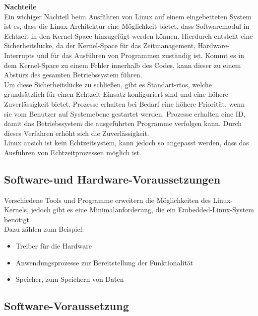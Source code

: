 \textbf{Nachteile}\\
Ein wichiger Nachteil beim Ausführen von Linux auf einem eingebetteten System ist es, dass die Linux-Architektur eine Möglichkeit bietet, dass Softwaremodul in
Echtzeit in den Kernel-Space hinzugefügt werden können. Hierdurch entsteht eine Sicherheitslücke, da der Kernel-Space für das Zeitmanagement, Hardware-Interrupts und
für das Ausführen von Programmen zuständig ist. Kommt es in dem Kernel-Space zu einem Fehler innerhalb des Codes, kann dieser zu einem Absturz des gesamten
Betriebssystem führen.\\
Um diese Sicherheitslücke zu schließen, gibt es Standart-\ac{rtos}, welche grundsätzlich für einen Echtzeit-Einsatz konfiguriert sind und eine höhere Zuverlässigkeit bietet.
Prozesse erhalten bei Bedarf eine höhere Priorität,
 wenn sie vom Benutzer auf Systemebene gestartet werden. Prozesse erhalten eine ID, damit das Betriebssystem die ausgeführten Programme verfolgen kann.
  Durch dieses Verfahren erhöht sich die Zuverlässigkeit.\cite{ibm}\\
Linux ansich ist kein Echtzeitsystem, kann jedoch so angepasst werden, dass das Ausführen von Echtzeitprozessen möglich ist.

\subsection{Software-und Hardware-Voraussetzungen}\label{kap:voraussetzungen}

Verschiedene Tools und Programme erweitern die Möglichkeiten des Linux-Kernels, jedoch gibt es eine Minimalanforderung, die ein Embedded-Linux-System benötigt.\\
Dazu zählen zum Beispiel:
\begin{itemize}
  \item Treiber für die Hardware
  \item Anwendungsprozesse zur Bereitstellung der Funktionalität
  \item Speicher, zum Speichern von Daten
\end{itemize}


\subsection{Software-Voraussetzung}\label{kap:softwarevoraussetzung}

